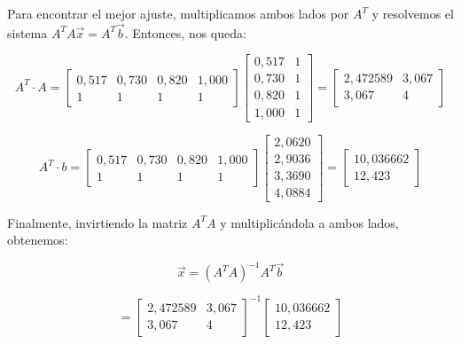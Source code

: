 Para encontrar el mejor ajuste, multiplicamos ambos lados por $A^T$ y resolvemos el sistema $A^T A \vec{x} = A^T \vec{b}$.
Entonces, nos queda:

\begin{equation}
    A^T \cdot A =
    \begin{bmatrix}
        0{,}517 & 0{,}730 & 0{,}820 & 1{,}000 \\
        1       & 1       & 1       & 1
    \end{bmatrix}
    \begin{bmatrix}
        0{,}517 & 1 \\
        0{,}730 & 1 \\
        0{,}820 & 1 \\
        1{,}000 & 1
    \end{bmatrix}
    =
    \begin{bmatrix}
        2{,}472589 & 3{,}067 \\
        3{,}067 & 4
    \end{bmatrix}
    \label{eq:cuadrados-minimos-ATA}
\end{equation}

\begin{equation}
    A^T \cdot b =
    \begin{bmatrix}
        0{,}517 & 0{,}730 & 0{,}820 & 1{,}000 \\
        1       & 1       & 1       & 1
    \end{bmatrix}
    \begin{bmatrix}
        2{,}0620 \\
        2{,}9036 \\
        3{,}3690 \\
        4{,}0884
    \end{bmatrix}
    =
    \begin{bmatrix}
        10{,}036662 \\
        12{,}423
    \end{bmatrix}
    \label{eq:cuadrados-minimos-ATb}
\end{equation}

Finalmente, invirtiendo la matriz $A^T A$ y multiplicándola a ambos lados, obtenemos:

\begin{equation}
    \vec{x} = (A^T A)^{-1} A^T \vec{b}
    \label{eq:cuadrados-minimos-solucion-1}
\end{equation}

\begin{equation}
    =
    \begin{bmatrix}
        2{,}472589 & 3{,}067 \\
        3{,}067 & 4
    \end{bmatrix}
    ^{-1}
    \begin{bmatrix}
        10{,}036662 \\
        12{,}423
    \end{bmatrix}
    \label{eq:cuadrados-minimos-solucion-2}
\end{equation}

